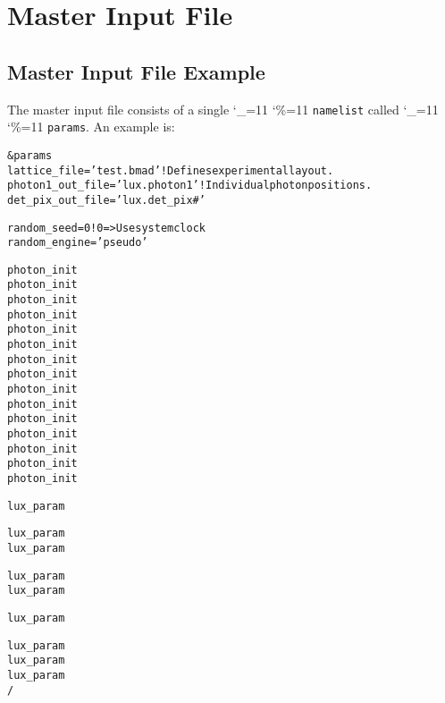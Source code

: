 \documentclass[11pt]{article}
\newcommand\ttcmd{\begingroup\catcode`\_=11 \catcode`\%=11 \dottcmd}
\newcommand\dottcmd[1]{\texttt{#1}\endgroup}
\newcommand{\vn}{\ttcmd}
\newenvironment{example}
  {\vspace{\ExBeg} \begin{alltt}}
  {\end{alltt} \vspace{\ExEnd}}
\newlength{\ExBeg}
\newlength{\ExEnd}
\begin{document}
\section{Master Input File} 
\label{s:master.file}

\subsection{Master Input File Example}
\label{ss:master.example}

The master input file consists of a single \vn{namelist} called \vn{params}.
An example is:
\begin{example}
  &params
    lattice_file = 'test.bmad'                     ! Defines experimental layout.
    photon1_out_file = 'lux.photon1'               ! Individual photon positions.
    det_pix_out_file = 'lux.det_pix#'

    random_seed = 0                                ! 0 => Use system clock
    random_engine = 'pseudo'

    photon_init%
    photon_init%
    photon_init%
    photon_init%
    photon_init%
    photon_init%
    photon_init%
    photon_init%
    photon_init%
    photon_init%
    photon_init%
    photon_init%
    photon_init%
    photon_init%
    photon_init%

    lux_param%

    lux_param%
    lux_param%

    lux_param%
    lux_param%

    lux_param%

    lux_param%
    lux_param%
    lux_param%
  /
\end{example}
\end{document}
